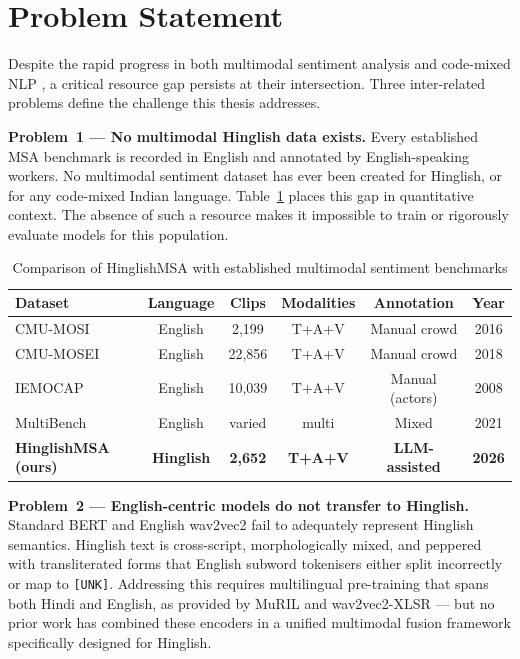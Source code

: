 \section{Problem Statement}

Despite the rapid progress in both multimodal sentiment analysis \cite{guo2023recent} and code-mixed NLP \cite{srinivasan2020code}, a critical resource gap persists at their intersection. Three inter-related problems define the challenge this thesis addresses.

\textbf{Problem~1 --- No multimodal Hinglish data exists.} Every established MSA benchmark is recorded in English and annotated by English-speaking workers. No multimodal sentiment dataset has ever been created for Hinglish, or for any code-mixed Indian language. Table~\ref{tab:dataset_comparison} places this gap in quantitative context. The absence of such a resource makes it impossible to train or rigorously evaluate models for this population.

\begin{table}[ht]
\centering
\caption{Comparison of HinglishMSA with established multimodal sentiment benchmarks}
\label{tab:dataset_comparison}
\renewcommand{\arraystretch}{1.3}
\begin{tabular}{lccccc}
\toprule
\textbf{Dataset} & \textbf{Language} & \textbf{Clips} & \textbf{Modalities} & \textbf{Annotation} & \textbf{Year} \\
\midrule
CMU-MOSI \cite{zadeh2016mosi}        & English  & 2{,}199  & T+A+V & Manual crowd       & 2016 \\
CMU-MOSEI \cite{zadeh2018multimodal} & English  & 22{,}856 & T+A+V & Manual crowd       & 2018 \\
IEMOCAP \cite{busso2008iemocap}      & English  & 10{,}039 & T+A+V & Manual (actors)    & 2008 \\
MultiBench \cite{liang2021multibench} & English & varied   & multi & Mixed              & 2021 \\
\midrule
\textbf{HinglishMSA (ours)} & \textbf{Hinglish} & \textbf{2{,}652} & \textbf{T+A+V} & \textbf{LLM-assisted} & \textbf{2026} \\
\bottomrule
\end{tabular}
\end{table}

\textbf{Problem~2 --- English-centric models do not transfer to Hinglish.} Standard BERT \cite{devlin2019bert} and English wav2vec2 \cite{baevski2020wav2vec} fail to adequately represent Hinglish semantics. Hinglish text is cross-script, morphologically mixed, and peppered with transliterated forms that English subword tokenisers either split incorrectly or map to \texttt{[UNK]}. Addressing this requires multilingual pre-training that spans both Hindi and English, as provided by MuRIL \cite{khanuja2021muril} and wav2vec2-XLSR \cite{conneau2021xlsr} --- but no prior work has combined these encoders in a unified multimodal fusion framework specifically designed for Hinglish.

